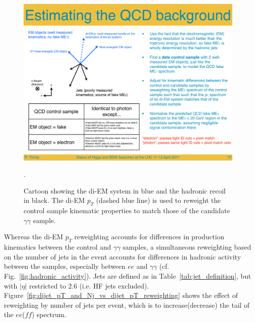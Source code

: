 \documentclass[dissertation.tex]{subfiles}
\begin{document}
\begin{figure}
	\centering
	\includegraphics[scale=0.5]{di-EM_pT_cartoon}
	\caption{Cartoon showing the di-EM system in blue and the hadronic recoil in black.  The di-EM $p_{T}$ (dashed blue line) is used to reweight the control sample kinematic properties to match those of the candidate $\gamma\gamma$ sample.}.
	\label{fig:di-EM_pT_cartoon}
\end{figure}

Whereas the di-EM $p_{T}$ reweighting accounts for differences in production kinematics between the control and $\gamma\gamma$ samples, a simultaneous reweighting based on the number of jets in the event accounts for differences in hadronic activity between the samples, especially between $ee$ and $\gamma\gamma$ (cf. Fig.~\ref{fig:hadronic_activity}).  Jets are defined as in Table~\ref{tab:jet_definition}, but with $|\eta|$ restricted to 2.6 (i.e. HF jets excluded).  Figure~\ref{fig:dijet_pT_and_Nj_vs_dijet_pT_reweighting} shows the effect of reweighting by number of jets per event, which is to increase(decrease) the tail of the $ee$($\mathit{ff}$) \MET spectrum.
\end{document}
